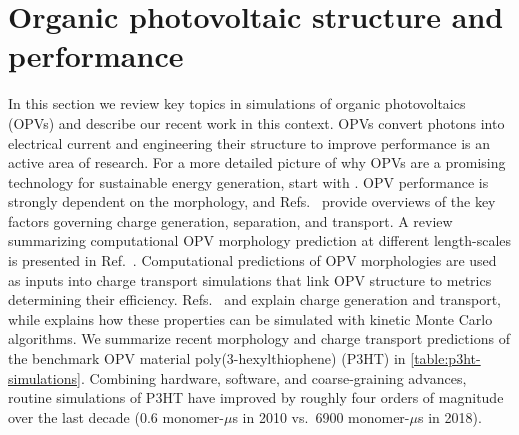 \section{Organic photovoltaic structure and performance}\label{s:opv}
In this section we review key topics in simulations of organic photovoltaics (OPVs) and describe our recent work in this context.
OPVs convert photons into electrical current and engineering their structure to improve performance is an active area of research.
For a more detailed picture of why OPVs are a promising technology for sustainable energy generation, start with \cite{Espinosa2012,Mazzio2015}.
OPV performance is strongly dependent on the morphology, and Refs.~\cite{Vandewal2013,Clarke2010} provide overviews of the key factors governing charge generation, separation, and transport.
A review summarizing computational OPV morphology prediction at different length-scales is presented in Ref.~\cite{Harrelson2017}.
Computational predictions of OPV morphologies are used as inputs into charge transport simulations that link OPV structure to metrics determining their efficiency. 
Refs.~\cite{Clarke2010} and \cite{Groves2013b} explain charge generation and transport, while \cite{Groves2017a} explains how these properties can be simulated with kinetic Monte Carlo algorithms.
We summarize recent morphology and charge transport predictions of the benchmark OPV material poly(3-hexylthiophene) (P3HT) in \autoref{table:p3ht-simulations}.
Combining hardware, software, and coarse-graining advances, routine simulations of P3HT have improved by roughly four orders of magnitude over the last decade (0.6 monomer-$\mu$s in 2010 vs.~6900 monomer-$\mu$s in 2018). 


